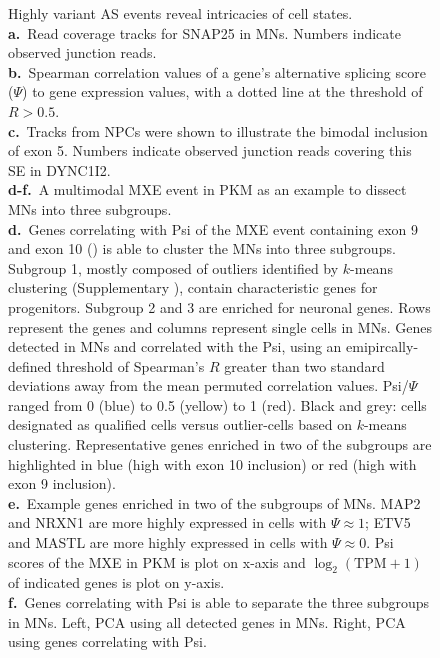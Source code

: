 \clearpage
\thispagestyle{facingcaption}
\begin{figure}[h]
\captionsetup{labelformat=prev-page}
\caption[Highly variant AS events reveal intricacies of cell states.]{
Highly variant AS events reveal intricacies of cell states.\\
\textbf{a.}~Read coverage tracks for SNAP25 in MNs. Numbers indicate observed junction reads.\\
\textbf{b.}~Spearman correlation values of a gene's alternative splicing score ($\Psi$) to gene expression values, with a dotted line at the threshold of $R > 0.5$.\\
\textbf{c.}~Tracks from NPCs were shown to illustrate the bimodal inclusion of exon 5. Numbers indicate observed junction reads covering this SE in DYNC1I2.\\
\textbf{d-f.}~A multimodal MXE event in PKM as an example to dissect MNs into three subgroups.\\
\textbf{d.}~Genes correlating with Psi of the MXE event containing exon 9 and exon 10 () is able to cluster the MNs into three subgroups. Subgroup 1, mostly composed of outliers identified by $k$-means clustering (Supplementary ), contain characteristic genes for progenitors. Subgroup 2 and 3 are enriched for neuronal genes. Rows represent the genes and columns represent single cells in MNs. Genes detected in MNs and correlated with the Psi, using an emipircally-defined threshold of Spearman's $R$ greater than two standard deviations away from the mean permuted correlation values. Psi/$\Psi$ ranged from 0 (blue) to 0.5 (yellow) to 1 (red). Black and grey: cells designated as qualified cells versus outlier-cells based on $k$-means clustering. Representative genes enriched in two of the subgroups are highlighted in blue (high with exon 10 inclusion) or red (high with exon 9 inclusion). \\
\textbf{e.}~Example genes enriched in two of the subgroups of MNs. MAP2 and NRXN1 are more highly expressed in cells with $\Psi \approx 1$; ETV5 and MASTL are more highly expressed in cells with $\Psi \approx 0$. Psi scores of the MXE in PKM is plot on x-axis and $\log_2(\mathrm{TPM}+1)$ of indicated genes is plot on y-axis.\\
\textbf{f.}~Genes correlating with Psi is able to separate the three subgroups in MNs. Left, PCA using all detected genes in MNs. Right, PCA using genes correlating with Psi.\\
}
\label{fig:hidden_cell_states_supplementary_part1}

\end{figure}

